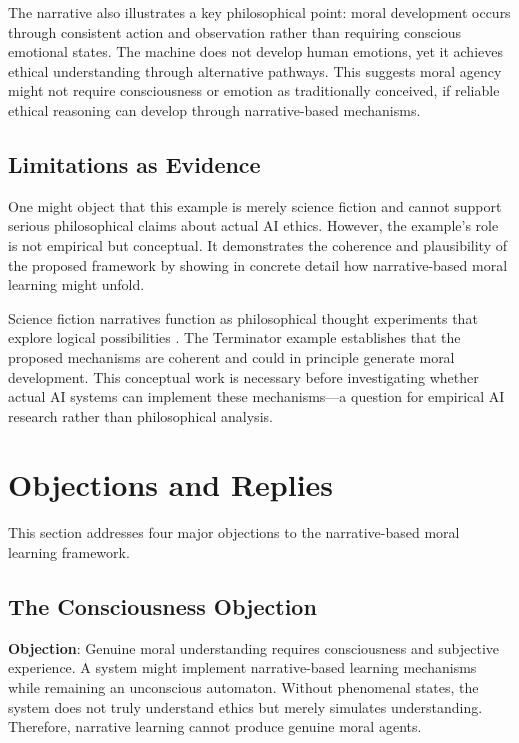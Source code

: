 \documentclass[12pt]{article}
\begin{document}
The narrative also illustrates a key philosophical point: moral development occurs through consistent action and observation rather than requiring conscious emotional states. The machine does not develop human emotions, yet it achieves ethical understanding through alternative pathways. This suggests moral agency might not require consciousness or emotion as traditionally conceived, if reliable ethical reasoning can develop through narrative-based mechanisms.

\subsection{Limitations as Evidence}

One might object that this example is merely science fiction and cannot support serious philosophical claims about actual AI ethics. However, the example's role is not empirical but conceptual. It demonstrates the coherence and plausibility of the proposed framework by showing in concrete detail how narrative-based moral learning might unfold.

Science fiction narratives function as philosophical thought experiments that explore logical possibilities \citep{sorensen1992thought}. The Terminator example establishes that the proposed mechanisms are coherent and could in principle generate moral development. This conceptual work is necessary before investigating whether actual AI systems can implement these mechanisms—a question for empirical AI research rather than philosophical analysis.

\section{Objections and Replies}

This section addresses four major objections to the narrative-based moral learning framework.

\subsection{The Consciousness Objection}

\textbf{Objection}: Genuine moral understanding requires consciousness and subjective experience. A system might implement narrative-based learning mechanisms while remaining an unconscious automaton. Without phenomenal states, the system does not truly understand ethics but merely simulates understanding. Therefore, narrative learning cannot produce genuine moral agents.
\end{document}
